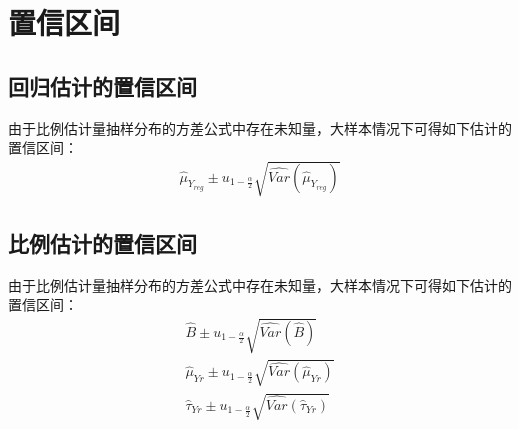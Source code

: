 \section{置信区间}

\subsection{回归估计的置信区间}
由于比例估计量抽样分布的方差公式中存在未知量，大样本情况下可得如下估计的置信区间：
\begin{gather*}
	\hat{\mu}_{Y_{reg}}\pm u_{1-\frac{\alpha}{2}}\sqrt{\widehat{Var}(\hat{\mu}_{Y_{reg}})}
\end{gather*}

\subsection{比例估计的置信区间}
由于比例估计量抽样分布的方差公式中存在未知量，大样本情况下可得如下估计的置信区间：
\begin{gather*}
	\hat{B}\pm u_{1-\frac{\alpha}{2}}\sqrt{\widehat{Var}(\hat{B})} \\
	\hat{\mu}_{Yr}\pm u_{1-\frac{\alpha}{2}}\sqrt{\widehat{Var}(\hat{\mu}_{Yr})} \\
	\hat{\tau}_{Yr}\pm u_{1-\frac{\alpha}{2}}\sqrt{\widehat{Var}(\hat{\tau}_{Yr})}
\end{gather*}